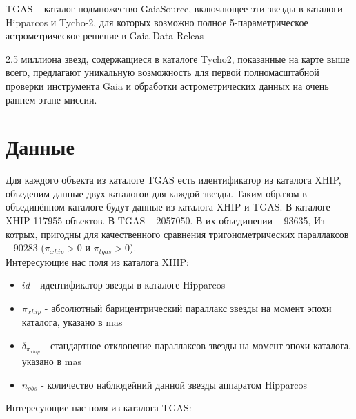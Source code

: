 \documentclass[14pt]{article} %
\begin{document}
TGAS -- каталог подмножество GaiaSource, включающее эти звезды в каталоги Hipparcos и Tycho-2, для которых возможно полное 5-параметрическое астрометрическое решение в Gaia Data Releas

2.5 миллиона звезд, содержащиеся в каталоге Tycho2, показанные на карте выше всего, предлагают уникальную возможность для первой полномасштабной проверки инструмента Gaia и обработки астрометрических данных на очень раннем этапе миссии.

\section{Данные}\label{sub:smthzd}
Для каждого объекта из каталоге TGAS есть идентификатор из каталога XHIP, объеденим данные двух каталогов для каждой звезды. Таким образом в объединённом каталоге будут данные из каталога XHIP и TGAS. В каталоге XHIP 117955 объектов. В TGAS -- 2057050. В их объединении -- 93635, Из котрых, пригодны для качественного сравнения тригонометрических параллаксов -- 90283 ($\pi_{xhip} > 0$ и $\pi_{tgas}>0$).
\\

Интересующие нас поля из каталога XHIP:
\begin{itemize}
\item $id$ - идентификатор звезды в каталоге Hipparcos

\item $\pi_{xhip}$ - абсолютный барицентрический параллакс звезды на момент эпохи каталога, указано в mas

\item $\delta_{\pi_{xhip}}$ - стандартное отклонение параллаксов звезды на момент эпохи каталога, указано в mas

\item $n_{obs}$ - количество наблюдейний данной звезды аппаратом Hipparcos\\

\end{itemize}


Интересующие нас поля из каталога TGAS:
\end{document}
